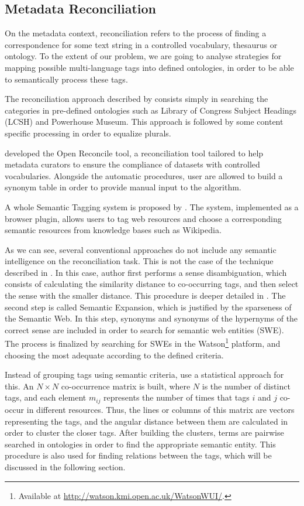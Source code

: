 \subsection{Metadata Reconciliation}
\label{sec:metadata_reconciliation}

On the metadata context, reconciliation refers to the process of finding a correspondence for some text string in a controlled vocabulary, thesaurus or ontology.
To the extent of our problem, we are going to analyse strategies for mapping possible multi-language tags into defined ontologies, in order to be able to semantically process these tags.

The reconciliation approach described by  consists simply in searching the categories in pre-defined ontologies such as Library of Congress Subject Headings (LCSH) and Powerhouse Museum.
This approach is followed by some content specific processing in order to equalize plurals. 

 developed the Open Reconcile tool, a reconciliation tool tailored to help metadata curators to ensure the compliance of datasets with controlled vocabularies.
Alongside the automatic procedures, user are allowed to build a synonym table in order to provide manual input to the algorithm.

A whole Semantic Tagging system is proposed by .
The system, implemented as a browser plugin, allows users to tag web resources and choose a corresponding semantic resources from knowledge bases such as Wikipedia.

As we can see, several conventional approaches do not include any semantic intelligence on the reconciliation task.
This is not the case of the technique described in .
In this case, author first performs a sense disambiguation, which consists of calculating the similarity distance to co-occurring tags, and then select the sense with the smaller distance.
This procedure is deeper detailed in .
The second step is called Semantic Expansion, which is justified by the sparseness of the Semantic Web.
In this step, synonyms and synonyms of the hypernyms of the correct sense are included in order to search for semantic web entities (SWE).
The process is finalized by searching for SWEs in the Watson\footnote{Available at \url{http://watson.kmi.open.ac.uk/WatsonWUI/}.} platform, and choosing the most adequate according to the defined criteria.

Instead of grouping tags using semantic criteria,  use a statistical approach for this.
An $N \times N$ co-occurrence matrix is built, where $N$ is the number of distinct tags, and each element $m_{ij}$ represents the number of times that tags $i$ and $j$ co-occur in different resources.
Thus, the lines or columns of this matrix are vectors representing the tags, and the angular distance between them are calculated in order to cluster the closer tags.
After building the clusters, terms are pairwise searched in ontologies in order to find the appropriate semantic entity.
This procedure is also used for finding relations between the tags, which will be discussed in the following section.

